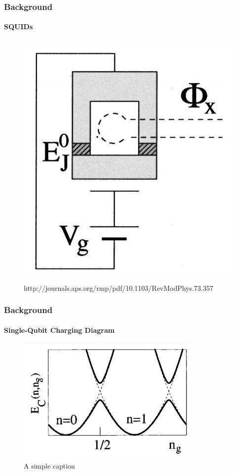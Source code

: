 \documentclass{beamer}
\begin{document}

\begin{frame}
    \frametitle{Background}
    \framesubtitle{SQUIDs}
    \begin{figure}[ht!]
        \centering
        \includegraphics[height=0.6\textheight]{img/squid.jpg}
        \caption{http://journals.aps.org/rmp/pdf/10.1103/RevModPhys.73.357}
    \end{figure}
\end{frame}


\begin{frame}
    \frametitle{Background}
    \framesubtitle{Single-Qubit Charging Diagram}
    \begin{figure}[ht!]
        \centering
        \includegraphics[width=0.8\textwidth]{img/single-qubit-band-diagram-only.jpg}
        \caption{A simple caption}
    \end{figure}
\end{frame}
\end{document}
